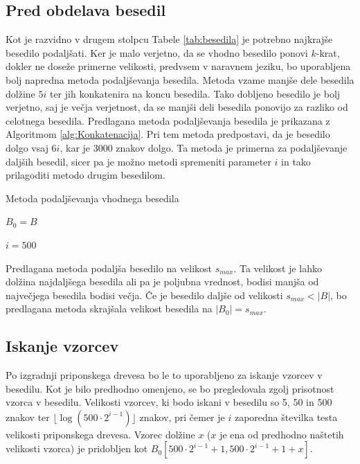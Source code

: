 \subsection{Pred obdelava besedil}

Kot je razvidno v drugem stolpcu Tabele \ref{tab:besedila} je potrebno najkrajše besedilo podaljšati. Ker je malo verjetno, da se vhodno besedilo ponovi $k$-krat, dokler ne doseže primerne velikosti, predvsem v naravnem jeziku, bo uporabljena bolj napredna metoda podaljševanja besedila. Metoda vzame manjše dele besedila dolžine $5i$ ter jih konkatenira na koncu besedila. Tako dobljeno besedilo je bolj verjetno, saj je večja verjetnost, da se manjši deli besedila ponovijo za razliko od celotnega besedila. Predlagana metoda podaljševanja besedila je prikazana z Algoritmom \ref{alg:Konkatenacija}. Pri tem metoda predpostavi, da je besedilo dolgo vsaj $6i$, kar je $3000$ znakov dolgo. Ta metoda je primerna za podaljševanje daljših besedil, sicer pa je možno metodi spremeniti parameter $i$ in tako prilagoditi metodo drugim besedilom.

\begin{algorithm}[htb]

\caption{Metoda podaljševanja vhodnega besedila}\label{alg:Konkatenacija}
{
    {$B_0=B$}

    {$i=500$}
    
    
}
\end{algorithm}

Predlagana metoda podaljša besedilo na velikost $s_{max}$. Ta velikost je lahko dolžina najdaljšega besedila ali pa je poljubna vrednost, bodisi manjša od največjega besedila bodisi večja. Če je besedilo daljše od velikosti $s_{max}<|B|$, bo predlagana metoda skrajšala velikost besedila na $|B_0|=s_{max}$.

\subsection{Iskanje vzorcev}

Po izgradnji priponskega drevesa bo le to uporabljeno za iskanje vzorcev v besedilu. Kot je bilo predhodno omenjeno, se bo pregledovala zgolj prisotnost vzorca v besedilu. Velikosti vzorcev, ki bodo iskani v besedilu so 5, 50 in 500 znakov ter $\lfloor\log{(500\cdot2^{i-1})}\rfloor$ znakov, pri čemer je $i$ zaporedna številka testa velikosti priponskega drevesa. Vzorec dolžine $x$ ($x$ je ena od predhodno naštetih velikosti vzorca) je pridobljen kot $B_0[500\cdot2^{i-1}+1,500\cdot2^{i-1}+1+x]$. 

